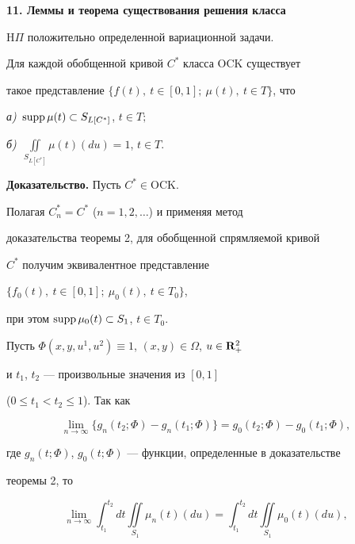 {\bf 11. Леммы и теорема существования решения класса


$\mathrm H\Pi$ положительно определенной вариационной задачи.}





\begin{lem}


Для каждой обобщенной кривой $C^*$ класса $\mathrm{OCK}$ существует


такое представление $\{f(t),\ t\in [0,1];\ \mu(t),\ t\in T\}$, что


{\em а)}~$\operatorname{supp}\mu(t)\subset S_{L[C^*]}$, $t\in T;$


{\em б)}~$\iint\limits_{ S_{L[C^*]}} \mu(t)(du)=1$, $t\in T$.


\end{lem}





{\bf Доказательство.} Пусть $C^*\in \mathrm{OCK}$.


Полагая $C^*_n=C^*$ ($n=1,2,\dotsc$) и применяя метод


доказательства теоремы 2, для обобщенной спрямляемой кривой


$C^*$ получим эквивалентное представление


$\{f_0(t),\ t\in [0,1];\ \mu_0(t),\ t\in T_0\}$,


при этом $\operatorname{supp}\mu_0(t) \subset S_1$, $t\in T_0$.





Пусть $\Phi(x,y, u^1,u^2) \equiv 1$, $(x,y)\in \Omega$, $u\in \bold R^2_+$


и $t_1$, $t_2$ --- произвольные значения из $[0,1]$


($0 \leq t_1 <t_2 \leq1$). Так как


$$


\lim_{n\to \infty}\{g_n(t_2;\Phi)-g_n(t_1;\Phi)\}=


g_0(t_2;\Phi)-g_0(t_1;\Phi),


$$


где $g_n(t;\Phi)$, $g_0(t;\Phi)$ --- функции, определенные в доказательстве


теоремы 2, то


$$


\lim_{n\to \infty } \int_{t_1}^{t_2} dt \iint\limits_{S_1}


\mu_n(t)(du)= \int_{t_1}^{t_2} dt \iint\limits_{S_1} \mu_0(t)(du),


$$


